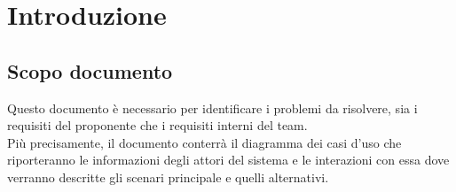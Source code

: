 \section{Introduzione}
\subsection{Scopo documento}
Questo documento è necessario per identificare i problemi da risolvere, sia i requisiti del proponente che i requisiti interni del team.\\
Più precisamente, il documento conterrà il diagramma dei casi d’uso che riporteranno le informazioni degli attori del sistema e le interazioni con essa dove verranno descritte gli scenari principale e quelli alternativi. 